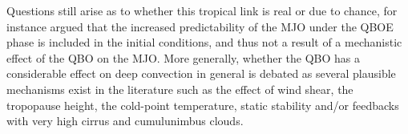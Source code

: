  Questions still arise as to whether this tropical link is real or due to chance, for instance \cite{wang2019} argued that the increased predictability of the MJO under the QBOE phase is included in the initial conditions, and thus not a result of a mechanistic effect of the QBO on the MJO. More generally, whether the QBO has a considerable effect on deep convection in general is debated as several plausible mechanisms exist in the literature \citep[see e.g.][]{nie2015} such as the effect of wind shear, the tropopause height, the cold-point temperature, static stability and/or feedbacks with very high cirrus and cumulunimbus clouds. 

